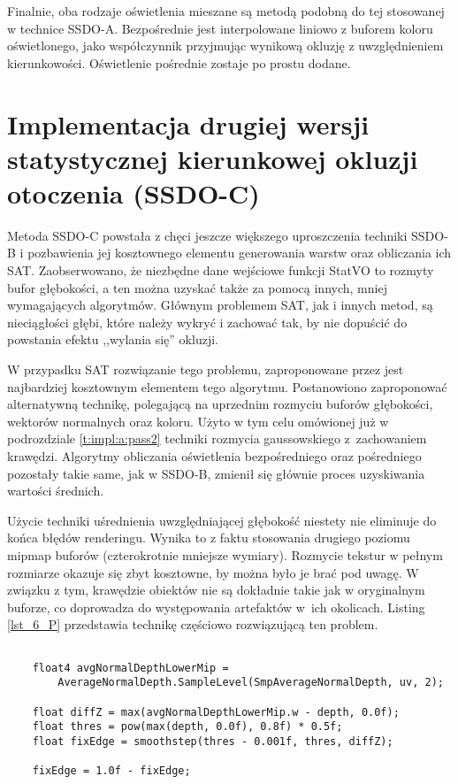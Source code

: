 		Finalnie, oba rodzaje oświetlenia mieszane są metodą podobną do tej stosowanej w technice SSDO-A. Bezpośrednie jest interpolowane liniowo z buforem koloru oświetlonego, jako współczynnik przyjmując wynikową okluzję z uwzględnieniem kierunkowości. Oświetlenie pośrednie zostaje po prostu dodane.

	\section{Implementacja drugiej wersji statystycznej kierunkowej okluzji otoczenia (SSDO-C)}
	\label{t:impl:c}
	
	
	
	Metoda SSDO-C powstała z chęci jeszcze większego uproszczenia techniki SSDO-B i pozbawienia jej kosztownego elementu generowania warstw oraz obliczania ich SAT. Zaobserwowano, że niezbędne dane wejściowe funkcji StatVO to rozmyty bufor głębokości, a ten można uzyskać także za pomocą innych, mniej wymagających algorytmów. Głównym problemem SAT, jak i innych metod, są nieciągłości głębi, które należy wykryć i zachować tak, by nie dopuścić do powstania efektu ,,wylania się'' okluzji. 
	
	W przypadku SAT rozwiązanie tego problemu, zaproponowane przez \cite{statvo} jest najbardziej kosztownym elementem tego algorytmu. Postanowiono zaproponować alternatywną technikę, polegającą na uprzednim rozmyciu buforów głębokości, wektorów normalnych oraz koloru. Użyto w tym celu omówionej już w podrozdziale \ref{t:impl:a:pass2} techniki rozmycia gaussowskiego z~zachowaniem krawędzi. Algorytmy obliczania oświetlenia bezpośredniego oraz pośredniego pozostały takie same, jak w SSDO-B, zmienił się głównie proces uzyskiwania wartości średnich.
	
	Użycie techniki uśrednienia uwzględniającej głębokość niestety nie eliminuje do końca błędów renderingu. Wynika to z faktu stosowania drugiego poziomu mipmap buforów (czterokrotnie mniejsze wymiary). Rozmycie tekstur w pełnym rozmiarze okazuje się zbyt kosztowne, by można było je brać pod uwagę. W związku z tym, krawędzie obiektów nie są dokładnie takie jak w oryginalnym buforze, co doprowadza do występowania artefaktów w~ich okolicach. Listing \ref{lst_6_P} przedstawia technikę częściowo rozwiązującą ten problem.\pagebreak
	
	\begin{lstlisting}[language=HLSL,caption={Naprawa artefaktu występującego w okolicach krawędzi w technice SSDO-C.},label={lst_6_P}]
	
	float4 avgNormalDepthLowerMip = 
		AverageNormalDepth.SampleLevel(SmpAverageNormalDepth, uv, 2);
	
	float diffZ = max(avgNormalDepthLowerMip.w - depth, 0.0f);
	float thres = pow(max(depth, 0.0f), 0.8f) * 0.5f;
	float fixEdge = smoothstep(thres - 0.001f, thres, diffZ);
	
	fixEdge = 1.0f - fixEdge;
	
	\end{lstlisting}
	
